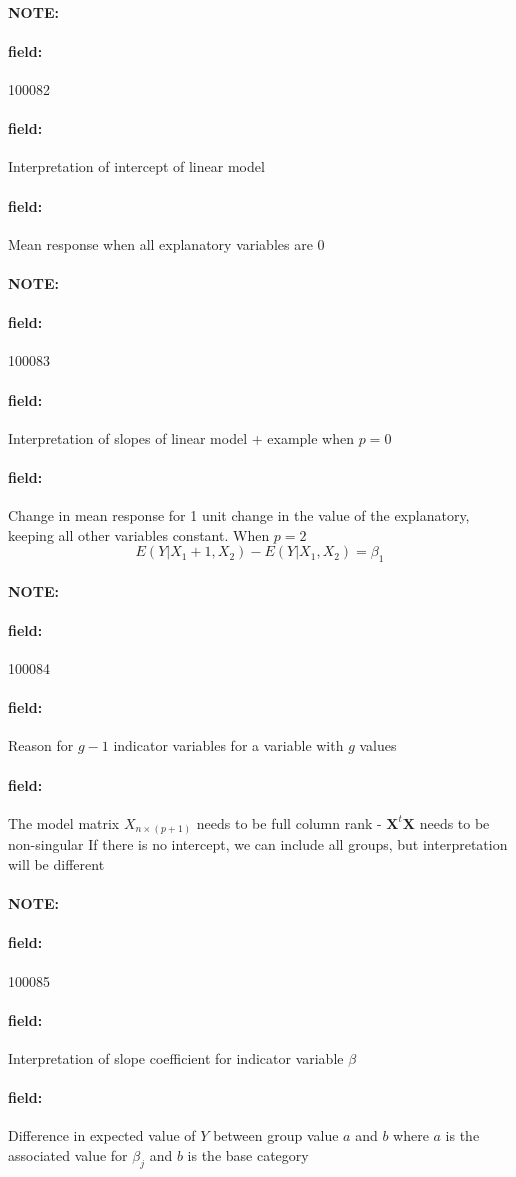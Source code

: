 \documentclass[12pt]{article}
\newenvironment{note}{\paragraph{NOTE:}}{}
\newenvironment{field}{\paragraph{field:}}{}
\begin{document}
\begin{note} \begin{field} \tiny 100082 \end{field}
 \begin{field}
  Interpretation of intercept of linear model
 \end{field}
 \begin{field}
  Mean response when all explanatory variables are 0
 \end{field}
\end{note}



\begin{note} \begin{field} \tiny 100083 \end{field}
 \begin{field}
  Interpretation of slopes of linear model + example when $p = 0$
 \end{field}
 \begin{field}
  Change in mean response for 1 unit change in the value of the explanatory, keeping all other variables constant. When $p = 2$
  $$ E(Y|X_1 + 1, X_2) - E(Y|X_1,X_2) = \beta_1$$
 \end{field}
\end{note}

\begin{note} \begin{field} \tiny 100084 \end{field}
 \begin{field}
  Reason for $g-1$ indicator variables for a variable with $g$ values
 \end{field}
 \begin{field}
  The model matrix $X_{n \times(p+1)}$ needs to be full column rank - $\mathbf{X}^t \mathbf{X}$ needs to be non-singular
  If there is no intercept, we can include all groups, but interpretation will be different
 \end{field}
\end{note}

\begin{note} \begin{field} \tiny 100085 \end{field}
 \begin{field}
  Interpretation of slope coefficient for indicator variable $\beta$
 \end{field}
 \begin{field}
  Difference in expected value of $Y$ between group value $a$ and $b$ where $a$ is the associated value for $\beta_j$ and $b$ is the base category
 \end{field}
\end{note}
\end{document}
